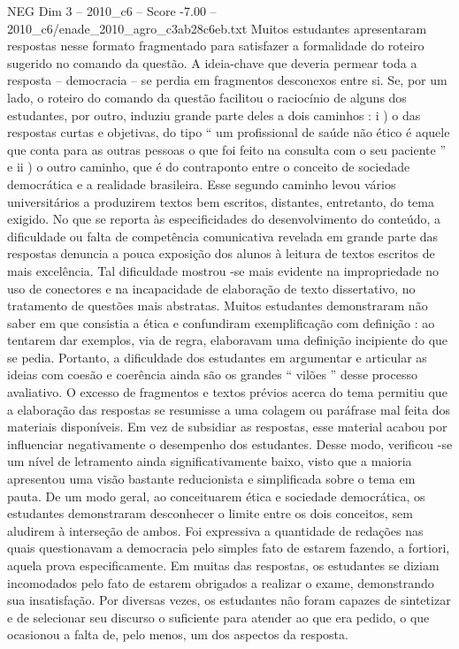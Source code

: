 \begin{textsample}{NEG Dim 3 – 2010\_c6 – Score -7.00 – 2010\_c6/enade\_2010\_agro\_c3ab28c6eb.txt}
Muitos estudantes apresentaram respostas nesse formato fragmentado para satisfazer a formalidade do roteiro sugerido no comando da questão.
A ideia-chave que deveria permear toda a resposta – democracia – se perdia em fragmentos desconexos entre si.
Se, por um lado, o roteiro do comando da questão facilitou o raciocínio de alguns dos estudantes, por outro, induziu grande parte deles a dois caminhos : i ) o das respostas curtas e objetivas, do tipo “ um profissional de saúde não ético é aquele que conta para as outras pessoas o que foi feito na consulta com o seu paciente ” e ii ) o outro caminho, que é do contraponto entre o conceito de sociedade democrática e a realidade brasileira.
Esse segundo caminho levou vários universitários a produzirem textos bem escritos, distantes, entretanto, do tema exigido.
No que se reporta às especificidades do desenvolvimento do conteúdo, a dificuldade ou falta de competência comunicativa revelada em grande parte das respostas denuncia a pouca exposição dos alunos à leitura de textos escritos de mais excelência.
Tal dificuldade mostrou -se mais evidente na impropriedade no uso de conectores e na incapacidade de elaboração de texto dissertativo, no tratamento de questões mais abstratas.
Muitos estudantes demonstraram não saber em que consistia a ética e confundiram exemplificação com definição : ao tentarem dar exemplos, via de regra, elaboravam uma definição incipiente do que se pedia.
Portanto, a dificuldade dos estudantes em argumentar e articular as ideias com coesão e coerência ainda são os grandes “ vilões ” desse processo avaliativo.
O excesso de fragmentos e textos prévios acerca do tema permitiu que a elaboração das respostas se resumisse a uma colagem ou paráfrase mal feita dos materiais disponíveis.
Em vez de subsidiar as respostas, esse material acabou por influenciar negativamente o desempenho dos estudantes.
Desse modo, verificou -se um nível de letramento ainda significativamente baixo, visto que a maioria apresentou uma visão bastante reducionista e simplificada sobre o tema em pauta.
De um modo geral, ao conceituarem ética e sociedade democrática, os estudantes demonstraram desconhecer o limite entre os dois conceitos, sem aludirem à interseção de ambos.
Foi expressiva a quantidade de redações nas quais questionavam a democracia pelo simples fato de estarem fazendo, a fortiori, aquela prova especificamente.
Em muitas das respostas, os estudantes se diziam incomodados pelo fato de estarem obrigados a realizar o exame, demonstrando sua insatisfação.
Por diversas vezes, os estudantes não foram capazes de sintetizar e de selecionar seu discurso o suficiente para atender ao que era pedido, o que ocasionou a falta de, pelo menos, um dos aspectos da resposta.

\end{textsample}
